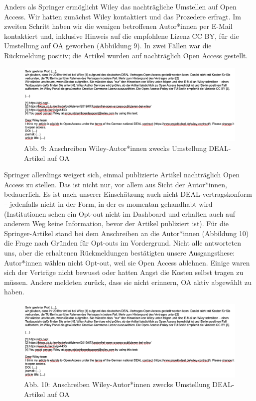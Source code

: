 \documentclass[a4paper,
fontsize=11pt,
oneside,
numbers=noperiodatend,
parskip=half-,
bibliography=totoc,
final
]{scrartcl}
\begin{document}
Anders als Springer ermöglicht Wiley das nachträgliche Umstellen auf
Open Access. Wir hatten zunächst Wiley kontaktiert und das Prozedere
erfragt. Im zweiten Schritt haben wir die wenigen betroffenen
Autor*innen per E-Mail kontaktiert und, inklusive Hinweis auf die
empfohlene Lizenz CC BY, für die Umstellung auf OA geworben (Abbildung
9). In zwei Fällen war die Rückmeldung positiv; die Artikel wurden auf
nachträglich Open Access gestellt.

\begin{figure}
\centering
\includegraphics[width=.9\textwidth]{img/optoutWileyauthor.png}
\caption{Abb. 9: Anschreiben Wiley-Autor*innen zwecks Umstellung
DEAL-Artikel auf OA}
\end{figure}

Springer allerdings weigert sich, einmal publizierte Artikel
nachträglich Open Access zu stellen. Das ist nicht nur, vor allem aus
Sicht der Autor*innen, bedauerlich. Es ist nach unserer Einschätzung
auch nicht DEAL-vertragskonform -- jedenfalls nicht in der Form, in der
es momentan gehandhabt wird (Institutionen sehen ein Opt-out nicht im
Dashboard und erhalten auch auf anderem Weg keine Information, bevor der
Artikel publiziert ist). Für die Springer-Artikel stand bei dem
Anschreiben an die Autor*innen (Abbildung 10) die Frage nach Gründen für
Opt-outs im Vordergrund. Nicht alle antworteten uns, aber die erhaltenen
Rückmeldungen bestätigten unsere Ausgangsthese: Autor*innen wählen nicht
Opt-out, weil sie Open Access ablehnen. Einige waren sich der Verträge
nicht bewusst oder hatten Angst die Kosten selbst tragen zu müssen.
Andere meldeten zurück, dass sie nicht erinnern, OA aktiv abgewählt zu
haben.

\begin{figure}
\centering
\includegraphics[width=.9\textwidth]{img/optoutWileyauthor.png}
\caption{Abb. 10: Anschreiben Wiley-Autor*innen zwecks Umstellung
DEAL-Artikel auf OA}
\end{figure}
\end{document}

